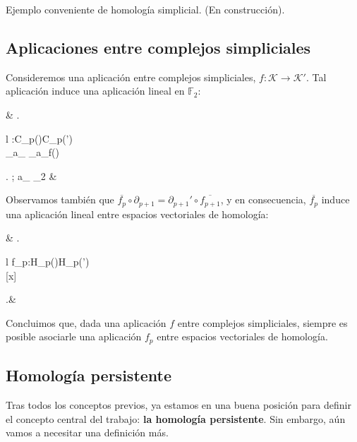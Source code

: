 \documentclass[12pt, a4paper]{article}
\numberwithin{equation}{section}
\theoremstyle{definition}
\newenvironment{ejem}
  {\pushQED{\qed}\renewcommand{\qedsymbol}{$\blacktriangleleft$}\ejemplo}
  {\popQED\endejemplo}
\theoremstyle{remark}
\theoremstyle{plain}
\begin{document}
		\begin{ejem}
			Ejemplo conveniente de homología simplicial. (En construcción).
		\end{ejem}	

	\subsection{Aplicaciones entre complejos simpliciales}

		Consideremos una aplicación entre complejos simpliciales, $f:\mathcal{K}\rightarrow\mathcal{K}'$. Tal aplicación induce una aplicación lineal en $\mathbb{F}_{2}$:
		\begin{flalign*}
			& \left.
			\begin{array}{l}
				:C_{p}()\rightarrow C_{p}(')\\[2pt] 
				\hspace{0.45cm} \displaystyle \sum_{}a_{\sigma}\sigma \mapsto 
				\displaystyle \sum_{}a_{\sigma}f(\sigma)
			\end{array}
			\right. ; \hspace{0.25cm} a_{\sigma} \in \mathbb{F}_{2} &
		\end{flalign*}
		
		Observamos también que $\overline{f_{p}}\circ\partial_{p+1}=\partial_{p+1}'\circ\overline{f_{p+1}}$, y en consecuencia, $\overline{f_{p}}$ induce una aplicación lineal
		entre espacios vectoriales de homología:	
		\begin{flalign*}
			& \left.
			\begin{array}{l}
				f_{p}:H_{p}()\rightarrow H_{p}(\mathcal{K}')\\[2pt] 
				\hspace{1.35cm} [x] \mapsto [\overline{f_{p}(x)}]
			\end{array}
			\right.&
		\end{flalign*}

		Concluimos que, dada una aplicación $f$ entre complejos simpliciales, siempre es posible asociarle una aplicación $f_{p}$ entre espacios vectoriales de homología.
	
	\subsection{Homología persistente}	
		
		Tras todos los conceptos previos, ya estamos en una buena posición para definir el concepto central del trabajo: \textbf{la homología persistente}. Sin embargo, aún
		vamos a necesitar una definición más.
\end{document}
